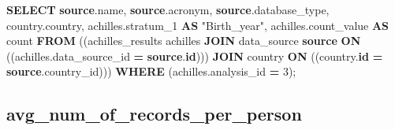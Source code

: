 \documentclass[
]{book}
\newenvironment{Shaded}{\begin{snugshade}}{\end{snugshade}}
\newcommand{\DecValTok}[1]{\textcolor[rgb]{0.00,0.00,0.81}{#1}}
\newcommand{\FunctionTok}[1]{\textcolor[rgb]{0.00,0.00,0.00}{#1}}
\newcommand{\KeywordTok}[1]{\textcolor[rgb]{0.13,0.29,0.53}{\textbf{#1}}}
\newcommand{\NormalTok}[1]{#1}
\newcommand{\OperatorTok}[1]{\textcolor[rgb]{0.81,0.36,0.00}{\textbf{#1}}}
\newcommand{\OtherTok}[1]{\textcolor[rgb]{0.56,0.35,0.01}{#1}}
\begin{document}
\begin{Shaded}
\begin{Highlighting}[]
\KeywordTok{SELECT} \KeywordTok{source}\NormalTok{.name,}
   \KeywordTok{source}\NormalTok{.acronym,}
   \KeywordTok{source}\NormalTok{.database\_type,}
\NormalTok{   country.country,}
\NormalTok{   achilles.stratum\_1 }\KeywordTok{AS} \OtherTok{"Birth\_year"}\NormalTok{,}
\NormalTok{   achilles.count\_value }\KeywordTok{AS} \FunctionTok{count}
  \KeywordTok{FROM}\NormalTok{ ((achilles\_results achilles}
    \KeywordTok{JOIN}\NormalTok{ data\_source }\KeywordTok{source} \KeywordTok{ON}\NormalTok{ ((achilles.data\_source\_id }\OperatorTok{=} \KeywordTok{source}\NormalTok{.}\KeywordTok{id}\NormalTok{)))}
    \KeywordTok{JOIN}\NormalTok{ country }\KeywordTok{ON}\NormalTok{ ((country.}\KeywordTok{id} \OperatorTok{=} \KeywordTok{source}\NormalTok{.country\_id)))}
 \KeywordTok{WHERE}\NormalTok{ (achilles.analysis\_id }\OperatorTok{=} \DecValTok{3}\NormalTok{);}
\end{Highlighting}
\end{Shaded}

\hypertarget{avg_num_of_records_per_person}{%
\subsection*{avg\_num\_of\_records\_per\_person}\label{avg_num_of_records_per_person}}
\end{document}
